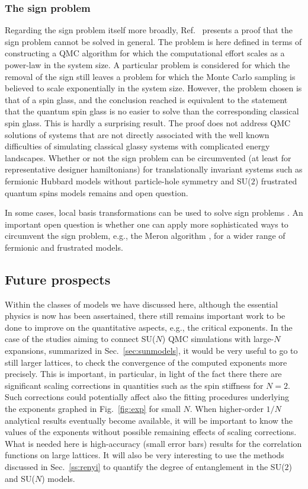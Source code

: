 \documentclass[range]{ar2e}
\begin{document}
\subsubsection{The sign problem}

Regarding the sign problem itself more broadly, Ref.~\cite{Troyer05} presents a proof that the sign problem cannot be solved in general. 
The problem is here defined in terms of constructing a QMC algorithm for which the computational effort scales as a power-law in the system
size. A particular problem is considered for which the removal of the sign still leaves a problem for which the Monte Carlo sampling is believed 
to scale exponentially in the system size. However, the problem chosen is that of a spin glass, and the conclusion reached is equivalent to
the statement that the quantum spin glass is no easier to solve than the corresponding classical spin glass. This is hardly a surprising result. 
The proof does not address QMC solutions of systems that are not directly associated with the well known difficulties of simulating 
classical glassy systems with complicated energy landscapes. Whether or not the sign problem can be circumvented (at least for representative 
designer hamiltonians) for translationally invariant systems such as fermionic Hubbard models without particle-hole symmetry and SU($2$) frustrated 
quantum spins models remains and open question.

In some cases, local basis transformations can be used to solve sign problems \cite{Nakamura97}. An important open question is whether one 
can apply more sophisticated ways to circumvent the sign problem, e.g., the Meron algorithm \cite{Chandrasekharan99}, for a wider range 
of fermionic and frustrated  models.

\subsection{Future prospects}

Within the classes of models we have discussed here, although the essential physics is now has been assertained, there still remains
important work to be done to improve on the quantitative aspects, e.g., the critical exponents. In the case of the studies aiming to connect
SU($N$) QMC simulations with large-$N$ expansions, summarized in Sec.~\ref{sec:sunmodels}, it would be very useful to go to still larger lattices, 
to check the convergence of the computed exponents more precisely. This is important, in particular, in light of the fact there there are significant scaling 
corrections in quantities such as the spin stiffness for $N=2$. Such corrections could potentially affect also the fitting procedures underlying 
the exponents graphed in Fig.~\ref{fig:exp} for small $N$. When higher-order $1/N$ analytical results eventually become available, it will be important to know 
the values of the exponents without possible remaining effects of scaling corrections. What is needed here is high-accuracy (small error bars) 
results for the correlation functions on large lattices. It will also be very interesting to use the methods discussed in Sec.~\ref{ss:renyi} to quantify 
the degree of entanglement in the SU($2$) and SU($N$) models.
\end{document}
